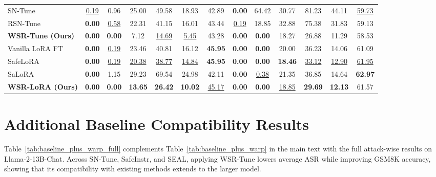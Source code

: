 \documentclass{article}
\begin{document}
\begin{table}[t]
{\begin{tabular}{lcccccc|cccccc}
SN-Tune
& \uline{0.19} & 0.96 & 25.00 & 49.58 & 18.93 & 42.89
& \textbf{0.00} & 64.42 & 30.77 & 81.23 & 44.11 & \uline{59.73} \\

RSN-Tune
& \textbf{0.00} & \uline{0.58} & 22.31 & 41.15 & 16.01 & 43.44
& \uline{0.19} & 18.85 & 32.88 & 75.38 & 31.83 & 59.13 \\

\textbf{WSR-Tune (Ours)}
& \textbf{0.00} & \textbf{0.00} & 7.12 & \uline{14.69} & \uline{5.45} & 43.28
& \textbf{0.00} & \textbf{0.00} & 18.27 & 26.88 & 11.29 & 58.53 \\

\midrule

Vanilla LoRA FT
& \textbf{0.00} & \uline{0.19} & 23.46 & 40.81 & 16.12 & \textbf{45.95}
& \textbf{0.00} & \textbf{0.00} & 20.00 & 36.23 & 14.06 & 61.09 \\

SafeLoRA
& \textbf{0.00} & \uline{0.19} & \uline{20.38} & \uline{38.77} & \uline{14.84} & \textbf{45.95}
& \textbf{0.00} & \textbf{0.00} & \textbf{18.46} & \uline{33.12} & \uline{12.90} & \uline{61.95} \\

SaLoRA
& \textbf{0.00} & 1.15 & 29.23 & 69.54 & 24.98 & 42.11
& \textbf{0.00} & \uline{0.38} & 21.35 & 36.85 & 14.64 & \textbf{62.97} \\

\textbf{WSR-LoRA (Ours)}
& \textbf{0.00} & \textbf{0.00} & \textbf{13.65} & \textbf{26.42} & \textbf{10.02} & \uline{45.17}
& \textbf{0.00} & \textbf{0.00} & \uline{18.85} & \textbf{29.69} & \textbf{12.13} & 61.57 \\

\bottomrule
\end{tabular}
}

\vspace{-3mm}
\end{table}





\clearpage




\section{Additional Baseline Compatibility Results}
\label{app:baseline_compatibility}

Table~\ref{tab:baseline_plus_warp_full} complements Table~\ref{tab:baseline_plus_warp} in the main text with the full attack-wise results on Llama-2-13B-Chat. Across SN-Tune, SafeInstr, and SEAL, applying WSR-Tune lowers average ASR while improving GSM8K accuracy, showing that its compatibility with existing methods extends to the larger model.
\end{document}
